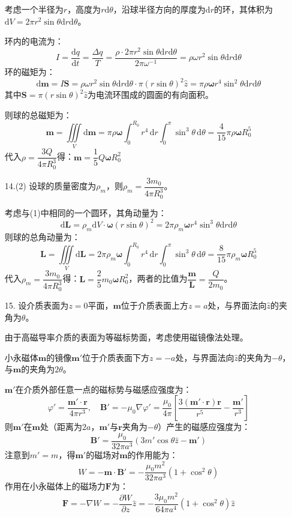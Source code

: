 \documentclass[a4paper,fontset=none]{ctexart}
\begin{document}
\begin{itemize}
    考虑一个半径为$r$，高度为$r\mathrm{d}\theta$，沿球半径方向的厚度为$\mathrm{d}r$的环，其体积为$\mathrm{d}V=2\pi r^2\sin\theta\mathrm{d}r\mathrm{d}\theta$。

    环内的电流为：
    \[
    I = \frac{\mathrm{d}q}{\mathrm{d}t} = \frac{\Delta q}{T} = \frac{\rho \cdot 2\pi r^2\sin\theta\mathrm{d}r\mathrm{d}\theta}{2\pi\omega^{-1}} = \rho\omega r^2\sin\theta\mathrm{d}r\mathrm{d}\theta
    \]
    环的磁矩为：
    \[
    \mathrm{d}\bm{m} = I\bm{S} = \rho\omega r^2\sin\theta\mathrm{d}r\mathrm{d}\theta \cdot \pi(r\sin\theta)^2\hat{z} = \pi\rho\bm{\omega}r^4\sin^2\theta\mathrm{d}r\mathrm{d}\theta
    \]
    其中$\bm{S}=\pi(r\sin\theta)^2\hat{z}$为电流环围成的圆面的有向面积。

    则球的总磁矩为：
    \[
    \bm{m} = \iiint\limits_V \mathrm{d}\bm{m} = \pi\rho\bm{\omega}\int_0^{R_0} r^4\,\mathrm{d}r \int_0^\pi \sin^3\theta\,\mathrm{d}\theta = \frac{4}{15}\pi\rho\bm{\omega}R_0^5
    \]
    代入$\rho=\dfrac{3Q}{4\pi R_0^3}$得：$\bm{m}=\dfrac{1}{5}Q\bm{\omega}R_0^2$

    \item[14.(2)]
    设球的质量密度为$\rho_m$，则$\rho_m=\dfrac{3m_0}{4\pi R_0^3}$。

    考虑与(1)中相同的一个圆环，其角动量为：
    \[
    \mathrm{d}\bm{L} = \rho_m\mathrm{d}V \cdot \bm{\omega}(r\sin\theta)^2 = 2\pi\rho_m\bm{\omega}r^4\sin^3\theta\mathrm{d}r\mathrm{d}\theta
    \]
    则球的总角动量为：
    \[
    \bm{L} = \iiint\limits_V \mathrm{d}\bm{L} = 2\pi\rho_m\bm{\omega}\int_0^{R_0} r^4\,\mathrm{d}r \int_0^\pi \sin^3\theta\,\mathrm{d}\theta = \frac{8}{15}\pi\rho_m\bm{\omega}R_0^5
    \]
    代入$\rho_m=\dfrac{3m_0}{4\pi R_0^3}$得：$\bm{L}=\dfrac{2}{5}m_0\bm{\omega}R_0^2$，两者的比值为$\dfrac{\bm{m}}{\bm{L}}=\dfrac{Q}{2m_0}$。

    \item[15.]
    设介质表面为$z=0$平面，$\bm{m}$位于介质表面上方$z=a$处，与界面法向$\hat{z}$的夹角为$\theta$。

    由于高磁导率介质的表面为等磁标势面，考虑使用磁镜像法处理。

    小永磁体$\bm{m}$的镜像$\bm{m}'$位于介质表面下方$z=-a$处，与界面法向$\hat{z}$的夹角为$-\theta$，与$\bm{m}$的夹角为$2\theta$。

    $\bm{m}'$在介质外部任意一点的磁标势与磁感应强度为：
    \[
        \varphi' = \frac{\bm{m}'\cdot\bm{r}}{4\pi r^3},\quad \bm{B}' = -\mu_0\nabla\varphi' = \frac{\mu_0}{4\pi}\left[\frac{3(\bm{m}'\cdot\bm{r})\bm{r}}{r^5}-\frac{\bm{m}'}{r^3}\right]
    \]
    则$\bm{m}'$在$\bm{m}$处（距离为$2a$，$\bm{m}'$与$\bm{r}$夹角为$-\theta$）产生的磁感应强度为：
    \[
        \bm{B}' = \frac{\mu_0}{32\pi a^3}(3m'\cos\theta\hat{z}-\bm{m}')
    \]
    注意到$m'=m$，得$\bm{m}'$的磁场对$\bm{m}$的作用能为：
    \[
        W = -\bm{m} \cdot \bm{B}' = -\frac{\mu_0 m^2}{32\pi a^3}\left(1+\cos^2\theta\right)
    \]
    作用在小永磁体上的磁场力$\bm{F}$为：
    \[
        \bm{F} = -\nabla W = -\frac{\partial W}{\partial z}\hat{z} = -\frac{3\mu_0 m^2}{64\pi a^4}\left(1+\cos^2\theta\right)\hat{z}
    \]

    \end{itemize}
\end{document}
